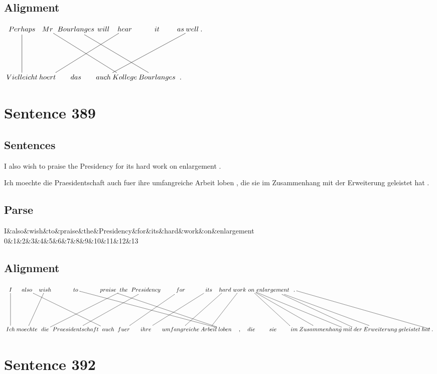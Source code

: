 \documentclass{report}
\begin{document}
\subsection*{Alignment}
\scriptsize{
$
\xymatrix@C-2.3pc{
Perhaps \ar @{-} [dd] & Mr \ar @{-} [ddrrr] & Bourlanges \ar @{-} [ddrrr] & will & hear \ar @{-} [ddlll] & it & as & well \ar @{-} [ddllll] & .\\\\
Vielleicht & hoert & das & auch & Kollege & Bourlanges & .
}$}
\newpage\section*{Sentence 389}

\subsection*{Sentences}
I also wish to praise the Presidency for its hard work on enlargement .

\noindent Ich moechte die Praesidentschaft auch fuer ihre umfangreiche Arbeit loben , die sie im Zusammenhang mit der Erweiterung geleistet hat .



\subsection*{Parse}
\begin{dependency}[theme=simple]
\begin{deptext}[column sep=.5cm, row sep=.1ex]
I\&also\&wish\&to\&praise\&the\&Presidency\&for\&its\&hard\&work\&on\&enlargement\\
0\&1\&2\&3\&4\&5\&6\&7\&8\&9\&10\&11\&12\&13\\
\end{deptext}
\end{dependency}


\subsection*{Alignment}
\scriptsize{
$
\xymatrix@C-2.3pc{
I \ar @{-} [dd] & also \ar @{-} [ddrrr] & wish \ar @{-} [ddl] & to \ar @{-} [ddrrrrrr] & praise \ar @{-} [ddrrrrr] & the \ar @{-} [ddlll] & Presidency \ar @{-} [ddlll] & for \ar @{-} [ddll] & its \ar @{-} [ddll] & hard \ar @{-} [ddll] & work \ar @{-} [ddll] & on \ar @{-} [ddrrr] \ar @{-} [ddrrrr] \ar @{-} [ddrr] & enlargement \ar @{-} [ddrrrr] \ar @{-} [ddrrrrr] & . \ar @{-} [ddrrrrrrr]\\\\
Ich & moechte & die & Praesidentschaft & auch & fuer & ihre & umfangreiche & Arbeit & loben & , & die & sie & im & Zusammenhang & mit & der & Erweiterung & geleistet & hat & .
}$}
\newpage\section*{Sentence 392}
\end{document}
